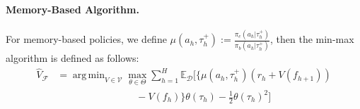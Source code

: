 \documentclass[twoside]{article}
\newtheorem{lemma}{Lemma}
\newtheorem{remark}{Remark}
\DeclareMathOperator*{\argmin}{arg\,min}
\newcommand{\R}{\mathbb{R}}
\newcommand{\CAL}[1]{\mathcal{#1}}
\begin{document}

\paragraph{Memory-Based Algorithm.}
For memory-based policies, we define $\mu(a_h,\tau_h^+):=\frac{\pi_e(a_h|\tau_h^+)}{\pi_b(a_h|\tau_h^+)}$, then the min-max algorithm is defined as follows:
\begingroup
\allowdisplaybreaks
\begin{align*}
\hat{V}_\CAL{F} &= \argmin_{V\in\CAL{V}} \max_{\theta \in \Theta}\sum_{h=1}^H\mathbb{E}_{\CAL{D}}[\{\mu(a_h,\tau_h^+)(r_h+V(f_{h+1}))\nonumber\\&\qquad\qquad\qquad\qquad-V(f_h)\}\theta(\tau_h)-\frac{1}{2}\theta(\tau_h)^2]
\end{align*}
\endgroup
\end{document}
